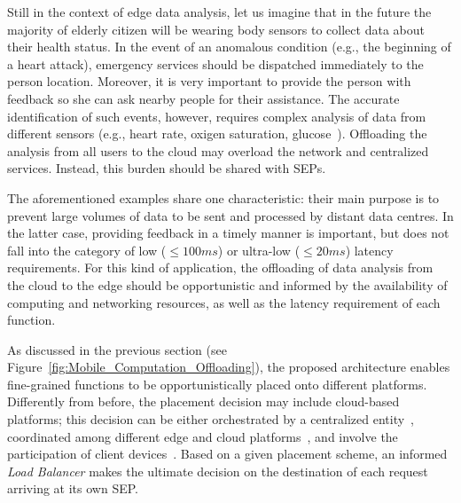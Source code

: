 \documentclass[letterpaper, 10 pt, conference]{ieeeconf}  %
\begin{document}
Still in the context of edge data analysis, 
let us imagine that in the future the majority of elderly citizen will be wearing body sensors to collect data about their health status. In the event of an anomalous condition (e.g., the beginning of a heart attack), emergency services should be dispatched immediately to the person location. Moreover, it is very important to provide the person with feedback so she can ask nearby people for their assistance.
The accurate identification of such events, however, requires complex analysis of data from different sensors (e.g., heart rate, oxigen saturation, glucose~\cite{}). Offloading the analysis from all users to the cloud may overload the network and centralized services. Instead, this burden should be shared with SEPs.%

The aforementioned examples share one characteristic: their main purpose is to prevent large volumes of data to be sent and processed by distant data centres. In the latter case, providing feedback in a timely manner is important, but does not fall into the category of low ($\leq 100ms$) or ultra-low ($\leq 20ms$) latency requirements. For this kind of application, the offloading of data analysis from the cloud to the edge should be opportunistic and informed by the availability of computing and networking resources, as well as the latency requirement of each function.

As discussed in the previous section (see Figure~\ref{fig:Mobile_Computation_Offloading}), the proposed architecture enables fine-grained functions to be opportunistically placed onto different platforms. Differently from before, the placement decision may include cloud-based platforms; this decision can be either orchestrated by a centralized entity~\cite{}, coordinated among different edge and cloud platforms~\cite{}, and involve the participation of client devices~\cite{}. Based on a given placement scheme, an informed \textit{Load Balancer} makes the ultimate decision on the destination of each request arriving at its own SEP.

\end{document}
